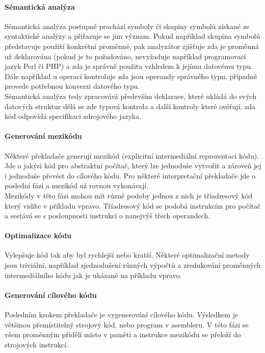 \documentclass[10pt,a4paper]{article}
\begin{document}
\paragraph{Sémantická analýza}
Sémantická analýza postupně prochází symboly či skupiny symbolů získané ze syntaktické analýzy a přiřazuje se jim význam. Pokud například skupina symbolů představuje použití konkrétní proměnné, pak analyzátor zjišťuje zda je proměnná už deklarována (pokud je to požadováno, nevyžaduje například programovací jazyk Perl či PHP) a zda je správně použita vzhledem k jejímu datovému typu. Dále například u operací kontroluje zda jsou operandy správného typu, případně provede potřebnou konverzi datového typu. \\
Sémantická analýza tedy zpracovává především deklarace, které ukládá do svých datových struktur dělá se zde typová kontrola a další kontroly které ověřují, zda kód odpovídá specifikaci zdrojového jazyka. 

\paragraph{Generování mezikódu}
Některé překladače generují mezikód (explicitní intermediální reprezentaci kódu). Jde o jakýsi kód pro abstraktní počítač, který lze jednoduše vytvořit a zároveň jej i jednoduše převést do cílového kódu. Pro některé interpretační překladače jde o poslední fázi a mezikód už rovnou vykonávají.\\
Mezikódy v této fázi mohou mít různé podoby jednou z nich je tříadresový kód který vidíte v příkladu vpravo. Tříadresový kód se podobá instrukcím pro počítač a sestává se s posloupnosti instrukcí o nanejvýš třech operandech.
\paragraph{Optimalizace kódu}
Vylepšuje kód tak aby byl rychlejší nebo kratší. Některé optimalizační metody jsou triviální, například zjednodušení různých výpočtů a zredukování proměnných intermediálního kódu jak je ukázané na příkladu vpravo.
\paragraph{Generování cílového kódu}
Posledním krokem překladače je vygenerování cílového kódu. Výsledkem je většinou přemístitelný strojový kód, nebo program v asembleru. V této fázi se všem proměnným přidělí místo v paměti a instrukce mezikódu se přeloží do strojových instrukcí.
\end{document}
